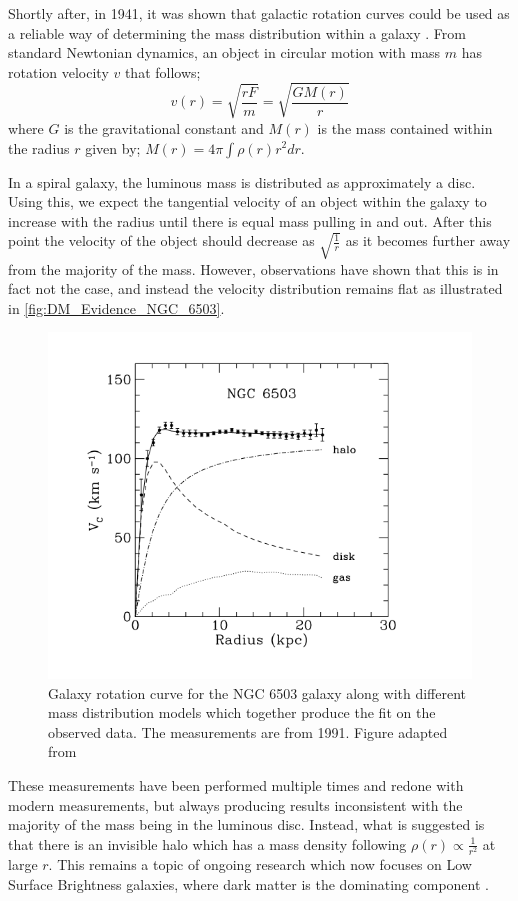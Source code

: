 \par
Shortly after, in 1941, it was shown that galactic rotation curves could be used as a reliable way of determining the mass distribution within a galaxy \cite{Chandrasekhar_1941_ref}.
From standard Newtonian dynamics, an object in circular motion with mass $m$ has rotation velocity $v$ that follows;
\begin{equation}
    v(r) = \sqrt{\frac{rF}{m}} = \sqrt{\frac{GM(r)}{r}}
    \label{eq:Kepler_Motion}
\end{equation}
where $G$ is the gravitational constant and $M(r)$ is the mass contained within the radius $r$ given by; $M(r) = 4 \pi \int \rho(r) r^{2} dr$.
\par
In a spiral galaxy, the luminous mass is distributed as approximately a disc. 
Using this, we expect the tangential velocity of an object within the galaxy to increase with the radius until there is equal mass pulling in and out.
After this point the velocity of the object should decrease as $\sqrt{\frac{1}{r}}$ as it becomes further away from the majority of the mass.
However, observations have shown that this is in fact not the case, and instead the velocity distribution remains flat as illustrated in \autoref{fig:DM_Evidence_NGC_6503}.
\begin{figure}[!htbp]%
    \centering
    \includegraphics[scale=1.0]{Figures/DarkMatterEvidence/NGC_6503_galaxy_speed.png}
    \caption[Galaxy rotation curve for the NGC 6503 galaxy]{Galaxy rotation curve for the NGC 6503 galaxy along with different mass distribution models which together produce the fit on the observed data. The measurements are from 1991. Figure adapted from \cite{NGC_6503_galaxy_rotation_ref}}
    \label{fig:DM_Evidence_NGC_6503}
\end{figure}
These measurements have been performed multiple times and redone with modern measurements, but always producing results inconsistent with the majority of the mass being in the luminous disc.
Instead, what is suggested is that there is an invisible halo which has a mass density following $\rho(r) \propto \frac{1}{r^2}$ at large $r$.
This remains a topic of ongoing research which now focuses on Low Surface Brightness galaxies, where dark matter is the dominating component \cite{MHONGOOSE_2018_ref}.



